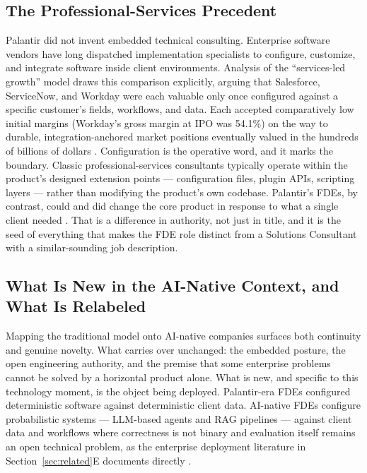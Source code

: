 \documentclass[journal]{IEEEtran}
\begin{document}
\subsection{The Professional-Services Precedent}

Palantir did not invent embedded technical consulting. Enterprise software vendors have long dispatched implementation specialists to configure, customize, and integrate software inside client environments. Analysis of the ``services-led growth'' model draws this comparison explicitly, arguing that Salesforce, ServiceNow, and Workday were each valuable only once configured against a specific customer's fields, workflows, and data. Each accepted comparatively low initial margins (Workday's gross margin at IPO was 54.1\%) on the way to durable, integration-anchored market positions eventually valued in the hundreds of billions of dollars \cite{schmidt2025servicesledgrowth}. Configuration is the operative word, and it marks the boundary. Classic professional-services consultants typically operate within the product's designed extension points --- configuration files, plugin APIs, scripting layers --- rather than modifying the product's own codebase. Palantir's FDEs, by contrast, could and did change the core product in response to what a single client needed \cite{orosz2025fde}. That is a difference in authority, not just in title, and it is the seed of everything that makes the FDE role distinct from a Solutions Consultant with a similar-sounding job description.

\subsection{What Is New in the AI-Native Context, and What Is Relabeled}

Mapping the traditional model onto AI-native companies surfaces both continuity and genuine novelty. What carries over unchanged: the embedded posture, the open engineering authority, and the premise that some enterprise problems cannot be solved by a horizontal product alone. What is new, and specific to this technology moment, is the object being deployed. Palantir-era FDEs configured deterministic software against deterministic client data. AI-native FDEs configure probabilistic systems --- LLM-based agents and RAG pipelines --- against client data and workflows where correctness is not binary and evaluation itself remains an open technical problem, as the enterprise deployment literature in Section~\ref{sec:related}E documents directly \cite{karakurt2026rag,mohammadi2025llmagentsurvey,wang2025llmagentdataanalysis,brehme2025ragtrust}.
\end{document}
